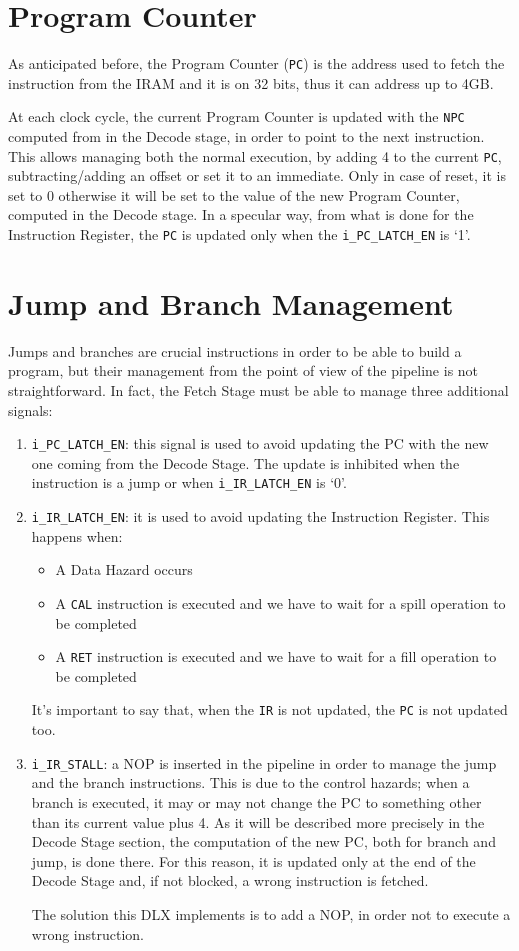 \section{Program Counter}
As anticipated before, the Program Counter (\texttt{PC}) is the address used to fetch the instruction from the IRAM and it is on 32 bits, thus it can address up to 4GB.

At each clock cycle, the current Program Counter is updated with the \texttt{NPC} computed from in the Decode stage, in order to point to the next instruction. This allows managing both the normal execution, by adding 4 to the current \texttt{PC}, subtracting/adding an offset or set it to an immediate. Only in case of reset, it is set to 0 otherwise it will be set to the value of the new Program Counter, computed in the Decode stage. In a specular way, from what is done for the Instruction Register, the \texttt{PC} is updated only when the \texttt{i\_PC\_LATCH\_EN} is `1'.

\section{Jump and Branch Management}
\label{sec:jmp_branch}
Jumps and branches are crucial instructions in order to be able to build a program, but their management from the point of view of the pipeline is not straightforward. In fact, the Fetch Stage must be able to manage three additional signals:
\begin{enumerate}
    \item \texttt{i\_PC\_LATCH\_EN}: this signal is used to avoid updating the PC with the new one coming from the Decode Stage. The update is inhibited when the instruction is a jump or when \texttt{i\_IR\_LATCH\_EN} is `0'. 
    \item \texttt{i\_IR\_LATCH\_EN}: it is used to avoid updating the Instruction Register. This happens when:
    \begin{itemize}
        \item A Data Hazard occurs
        \item A \texttt{CAL} instruction is executed and we have to wait for a spill operation to be completed
        \item A \texttt{RET} instruction is executed and we have to wait for a fill operation to be completed
    \end{itemize}
    It's important to say that, when the \texttt{IR} is not updated, the \texttt{PC} is not updated too.
    \item \texttt{i\_IR\_STALL}: a NOP is inserted in the pipeline in order to manage the jump and the branch instructions. This is due to the control hazards; when a branch is executed, it may or may not change the PC to something other than its current value plus 4. As it will be described more precisely in the Decode Stage section, the computation of the new PC, both for branch and jump, is done there. For this reason, it is updated only at the end of the Decode Stage and, if not blocked, a wrong instruction is fetched.
    
    The solution this DLX implements is to add a NOP, in order not to execute a wrong instruction.
\end{enumerate}